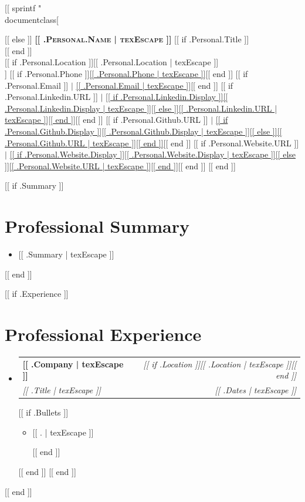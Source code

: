 [[ sprintf "\\documentclass[%
\makeatletter
\newcommand{\skySubheading}[4]{%
  \vspace{2pt}\item
  \begin{tabular*}{\linewidth}{@{}l@{\extracolsep{\fill}}r@{}}
    \textbf{\color{darkgrey}#1} & \small\textit{\color{midgrey}#2} \\
    \textit{\small\color{darkgrey}#3} & \textit{\small\color{midgrey}#4} \\
  \end{tabular*}\vspace{-2pt}%
}
\newcommand{\skyItem}[1]{%
  \item {\small\color{darkgrey}#1}\vspace{0pt}%
}
\newcommand{\skyListStart}{\begin{itemize}[leftmargin=0.15in, label={}]}
\newcommand{\skyListEnd}{\end{itemize}}
\newcommand{\skyBulletStart}{%
  \begin{itemize}[%
    leftmargin=0.20in,%
    label={\textcolor{skyblue}{\tiny$\blacksquare$}},%
    itemsep=1pt,%
    topsep=3pt,%
    parsep=1pt%
  ]%
}
\newcommand{\skyBulletEnd}{\end{itemize}\vspace{-2pt}}
\makeatother
\begin{document}
\begin{center}
\begin{minipage}[c]{0.78\textwidth}
  \end{minipage}
[[ else ]]
  {\Huge\bfseries\scshape\color{skyblue}[[ .Personal.Name | texEscape ]]}%
  [[ if .Personal.Title ]]\\[[ end ]]
  \\\vspace{3pt}
  [[ if .Personal.Location ]]{\small\color{midgrey}[[ .Personal.Location | texEscape ]]}\\[[ end ]]
  \small
  [[ if .Personal.Phone ]]\href{tel:[[ .Personal.Phone | texEscape ]]}{\color{darkgrey}[[ .Personal.Phone | texEscape ]]}[[ end ]]%
  [[ if .Personal.Email ]] $|$ \href{mailto:[[ .Personal.Email | texEscape ]]}{\color{darkgrey}[[ .Personal.Email | texEscape ]]}[[ end ]]%
  [[ if .Personal.Linkedin.URL ]] $|$ \href{[[ .Personal.Linkedin.URL | texEscape ]]}{\color{skyblue}[[ if .Personal.Linkedin.Display ]][[ .Personal.Linkedin.Display | texEscape ]][[ else ]][[ .Personal.Linkedin.URL | texEscape ]][[ end ]]}[[ end ]]%
  [[ if .Personal.Github.URL ]] $|$ \href{[[ .Personal.Github.URL | texEscape ]]}{\color{skyblue}[[ if .Personal.Github.Display ]][[ .Personal.Github.Display | texEscape ]][[ else ]][[ .Personal.Github.URL | texEscape ]][[ end ]]}[[ end ]]%
  [[ if .Personal.Website.URL ]] $|$ \href{[[ .Personal.Website.URL | texEscape ]]}{\color{skyblue}[[ if .Personal.Website.Display ]][[ .Personal.Website.Display | texEscape ]][[ else ]][[ .Personal.Website.URL | texEscape ]][[ end ]]}[[ end ]]
[[ end ]]
\end{center}
\vspace{-2pt}

[[ if .Summary ]]
\section{Professional Summary}
\skyListStart
  \item {\small\color{darkgrey}[[ .Summary | texEscape ]]}
\skyListEnd
\vspace{2pt}
[[ end ]]

[[ if .Experience ]]
\section{Professional Experience}
\skyListStart
  [[ range .Experience ]]
  \skySubheading
    {[[ .Company | texEscape ]]}{[[ if .Location ]][[ .Location | texEscape ]][[ end ]]}
    {[[ .Title | texEscape ]]}{[[ .Dates | texEscape ]]}
    [[ if .Bullets ]]
    \skyBulletStart
      [[ range texLines .Bullets ]]\skyItem{[[ . | texEscape ]]}
      [[ end ]]
    \skyBulletEnd
    [[ end ]]
  [[ end ]]
\skyListEnd
[[ end ]]
\end{document}
